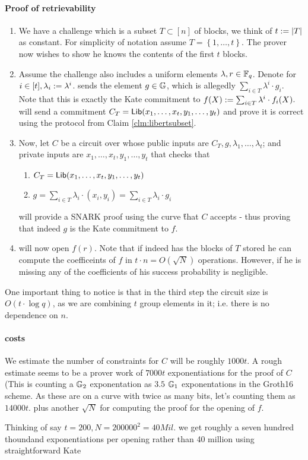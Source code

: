 \documentclass[11pt]{article}
\numberwithin{figure}{section} %
\newcommand{\set}[1]{\ensuremath{\left\{#1\right\}}\xspace}
\begin{document}
\paragraph{Proof of retrievability}
\begin{enumerate}
 \item We have a challenge which is a subset $T\subset [n]$ of blocks, we think of $t:= |T|$ as constant. For simplicity of notation assume $T=\set{1,\ldots,t}$. The prover \prv now wishes to show he knows the contents of the first $t$ blocks.
 \item\label{stp:comb} Assume the challenge also includes a uniform elements $\lambda,r\in{\mathbb F}_q$.
 Denote for $i\in [t], \lambda_i:= \lambda^i$.
 \prv sends the element $g\in {\mathbb G}$, which is allegedly $\sum_{i\in T} \lambda^i\cdot g_i$.
 Note that this is exactly the Kate commitment to $f(X):= \sum_{i\in T} \lambda^i\cdot f_i(X)$.
 \prv will send a commitment $C_T=\mathsf{Lib}(x_1,\ldots,x_t,y_1,\ldots,y_t)$ and prove it is correct using the protocol from Claim \ref{clm:libertsubset}.
 \item Now, let $C$ be a circuit over \Fr whose public inputs are $C_T,g,\lambda_1,\ldots,\lambda_t$; and private inputs are $x_1,\ldots,x_t,$$y_1,\ldots,y_t$ that checks that
 \begin{enumerate}
  \item $C_T=\mathsf{Lib}(x_1,\ldots,x_t,y_1,\ldots,y_t)$
  \item $g=\sum_{i\in T} \lambda_i \cdot (x_i,y_i) = \sum_{i\in T} \lambda_i \cdot g_i$ 
 \end{enumerate}
\prv will provide a SNARK proof using the curve \H that $C$ accepts - thus proving that indeed $g$ is the Kate commitment to $f$.
\item \prv  will now open $f(r)$. Note that if \prv indeed has the blocks of $T$ stored he can compute the coefficeints of $f$ in  $t\cdot n = O(\sqrt{N})$ operations. However, if he is missing any of the coefficients of  his success probability is negligible.
\end{enumerate}
 
One important thing to notice is that in the third step the circuit size is $O(t\cdot \log q)$,
as we are combining $t$ group elements in it; i.e. there is no dependence on $n$.
 
 
 \paragraph{costs}
 We estimate the number of constraints for $C$ will be roughly $1000t$.
 A rough estimate seems to be a prover work of $7000t$ exponentiations for the proof of $C$ (This is counting a ${\mathbb G}_2$ exponentation as $3.5$ ${\mathbb G}_1$ exponentations in the Groth16 scheme. 
 As these are on a curve with twice as many bits, let's counting them as $14000t$.
 plus another $\sqrt{N}$ for computing the proof for the opening of $f$.
 
 Thinking of say $t=200, N=200000^2 =40 Mil.$ we get roughly a seven hundred thoundand exponentiations  per opening rather than 40 million using straightforward Kate
 
 

\end{document}

